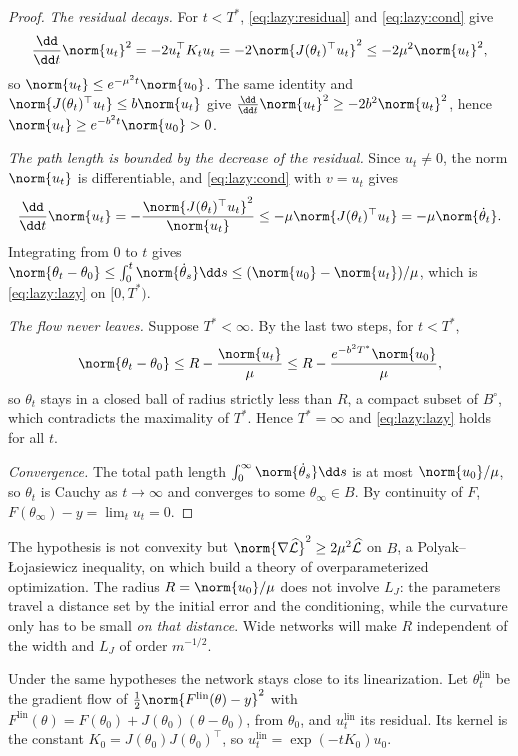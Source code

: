\begin{refsection}
\begin{proof}
\emph{The residual decays.} For $t<T^*$, \eqref{eq:lazy:residual} and \eqref{eq:lazy:cond} give
\[
  \frac{\dd}{\dd t}\norm{u_t}^2=-2u_t^\top K_tu_t=-2\norm{J(\theta_t)^\top u_t}^2\le-2\mu^2\norm{u_t}^2 ,
\]
so $\norm{u_t}\le e^{-\mu^2t}\norm{u_0}$. The same identity and $\norm{J(\theta_t)^\top u_t}\le b\norm{u_t}$ give $\frac{\dd}{\dd t}\norm{u_t}^2\ge-2b^2\norm{u_t}^2$, hence $\norm{u_t}\ge e^{-b^2t}\norm{u_0}>0$.

\emph{The path length is bounded by the decrease of the residual.} Since $u_t\ne0$, the norm $\norm{u_t}$ is differentiable, and \eqref{eq:lazy:cond} with $v=u_t$ gives
\[
  \frac{\dd}{\dd t}\norm{u_t}=-\frac{\norm{J(\theta_t)^\top u_t}^2}{\norm{u_t}}\le-\mu\norm{J(\theta_t)^\top u_t}=-\mu\norm{\dot\theta_t}.
\]
Integrating from $0$ to $t$ gives $\norm{\theta_t-\theta_0}\le\int_0^t\norm{\dot\theta_s}\dd s\le(\norm{u_0}-\norm{u_t})/\mu$, which is \eqref{eq:lazy:lazy} on $[0,T^*)$.

\emph{The flow never leaves.} Suppose $T^*<\infty$. By the last two steps, for $t<T^*$,
\[
  \norm{\theta_t-\theta_0}\le R-\frac{\norm{u_t}}\mu\le R-\frac{e^{-b^2T^*}\norm{u_0}}\mu ,
\]
so $\theta_t$ stays in a closed ball of radius strictly less than $R$, a compact subset of $B^\circ$, which contradicts the maximality of $T^*$. Hence $T^*=\infty$ and \eqref{eq:lazy:lazy} holds for all $t$.

\emph{Convergence.} The total path length $\int_0^\infty\norm{\dot\theta_s}\dd s$ is at most $\norm{u_0}/\mu$, so $\theta_t$ is Cauchy as $t\to\infty$ and converges to some $\theta_\infty\in B$. By continuity of $F$, $F(\theta_\infty)-y=\lim_tu_t=0$.
\end{proof}

The hypothesis is not convexity but $\norm{\nabla\Lhat}^2\ge2\mu^2\Lhat$ on $B$, a Polyak--{\L}ojasiewicz inequality, on which \textcite{LiuEtAl2022} build a theory of overparameterized optimization. The radius $R=\norm{u_0}/\mu$ does not involve $L_J$: the parameters travel a distance set by the initial error and the conditioning, while the curvature only has to be small \emph{on that distance}. Wide networks will make $R$ independent of the width and $L_J$ of order $m^{-1/2}$.

Under the same hypotheses the network stays close to its linearization. Let $\theta^{\mathrm{lin}}_t$ be the gradient flow of $\frac12\norm{F^{\mathrm{lin}}(\theta)-y}^2$ with $F^{\mathrm{lin}}(\theta)=F(\theta_0)+J(\theta_0)(\theta-\theta_0)$, from $\theta_0$, and $u^{\mathrm{lin}}_t$ its residual. Its kernel is the constant $K_0=J(\theta_0)J(\theta_0)^\top$, so $u^{\mathrm{lin}}_t=\exp(-tK_0)u_0$.


\end{refsection}
